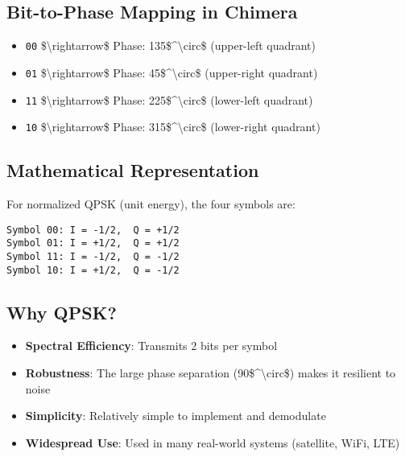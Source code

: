 \subsection{Bit-to-Phase Mapping in
Chimera}\label{bit-to-phase-mapping-in-chimera}

\begin{itemize}
\tightlist
\item
  \texttt{00} \$\textbackslash rightarrow\$ Phase:
  135\$\^{}\textbackslash circ\$ (upper-left quadrant)
\item
  \texttt{01} \$\textbackslash rightarrow\$ Phase:
  45\$\^{}\textbackslash circ\$ (upper-right quadrant)
\item
  \texttt{11} \$\textbackslash rightarrow\$ Phase:
  225\$\^{}\textbackslash circ\$ (lower-left quadrant)
\item
  \texttt{10} \$\textbackslash rightarrow\$ Phase:
  315\$\^{}\textbackslash circ\$ (lower-right quadrant)
\end{itemize}

\subsection{Mathematical
Representation}\label{mathematical-representation}

For normalized QPSK (unit energy), the four symbols are:

\begin{verbatim}
Symbol 00: I = -1/2,  Q = +1/2
Symbol 01: I = +1/2,  Q = +1/2
Symbol 11: I = -1/2,  Q = -1/2
Symbol 10: I = +1/2,  Q = -1/2
\end{verbatim}

\subsection{Why QPSK?}\label{why-qpsk}

\begin{itemize}
\tightlist
\item
  \textbf{Spectral Efficiency}: Transmits 2 bits per symbol
\item
  \textbf{Robustness}: The large phase separation
  (90\$\^{}\textbackslash circ\$) makes it resilient to noise
\item
  \textbf{Simplicity}: Relatively simple to implement and demodulate
\item
  \textbf{Widespread Use}: Used in many real-world systems (satellite,
  WiFi, LTE)
\end{itemize}

